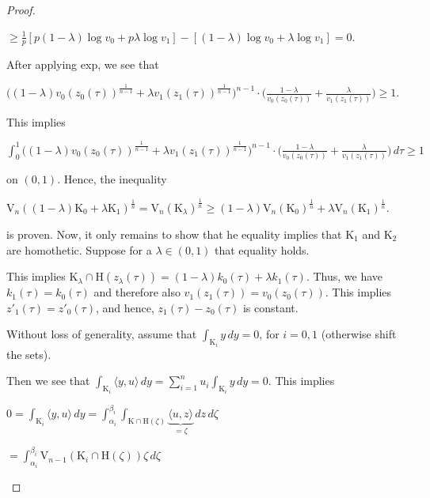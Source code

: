 \documentclass[a4paper]{book}
\numberwithin{theorem}{section}%
\begin{document}
\begin{proof}
\begin{center}
        $\geq\frac{1}{\mathit{p}}[\mathit{p}(1-\lambda)\log{v_{0}}+\mathit{p}\lambda\log{v_{1}}]-[(1-\lambda)\log{v_{0}}+\lambda\log{v_{1}}]=0$.
    \end{center}
    After applying exp, we see that
    \begin{center}
        $\displaystyle \Big((1-\lambda)v_{0}(z_{0}(\tau))^{\frac{1}{n-1}}+\lambda v_{1}(z_{1}(\tau))^{\frac{1}{n-1}}\Big)^{n-1}\cdot\Big(\frac{1-\lambda}{v_{0}(z_{0}(\tau))}+\frac{\lambda}{v_{1}(z_{1}(\tau))}\Big)\geq1$.
    \end{center}
    This implies
    \begin{center}
        $\displaystyle \int_{0}^{1}\Big((1-\lambda)v_{0}(z_{0}(\tau))^{\frac{1}{n-1}}+\lambda v_{1}(z_{1}(\tau))^{\frac{1}{n-1}}\Big)^{n-1}\cdot\Big(\frac{1-\lambda}{v_{0}(z_{0}(\tau))}+\frac{\lambda}{v_{1}(z_{1}(\tau))}\Big)\,d\tau\geq1$
    \end{center}
    on $(0,1)$. Hence, the inequality
    \begin{center}
        $\displaystyle \mathrm{V}_{n}((1-\lambda)\mathrm{K}_{0}+\lambda\mathrm{K}_{1})^{\frac{1}{n}}=\mathrm{V}_{n}(\mathrm{K}_{\lambda})^{\frac{1}{n}}\geq(1-\lambda)\mathrm{V}_{n}(\mathrm{K}_{0})^{\frac{1}{n}}+\lambda\mathrm{V}_{n}(\mathrm{K}_{1})^{\frac{1}{n}}$.
    \end{center}
    is proven. Now, it only remains to show that he equality implies that $\mathrm{K}_{1}$ and $\mathrm{K}_{2}$ are homothetic. Suppose for a $\lambda\in(0,1)$ that equality holds.

    This implies $\mathrm{K}_{\lambda}\cap\mathrm{H}(z_{\lambda}(\tau))=(1-\lambda)k_{0}(\tau)+\lambda k_{1}(\tau)$. Thus, we have $k_{1}(\tau)=k_{0}(\tau)$ and therefore also $v_{1}(z_{1}(\tau))=v_{0}(z_{0}(\tau))$. This implies $z'_{1}(\tau)=z'_{0}(\tau)$, and hence, $z_{1}(\tau)-z_{0}(\tau)$ is constant.

    Without loss of generality, assume that $\int_{\mathrm{K}_i}y\,dy=0$, for $i=0,1$ (otherwise shift the sets).

    Then we see that $\int_{\mathrm{K}_i}\langle y,u\rangle\,dy=\sum_{i=1}^{n}u_{i}\int_{\mathrm{K}_i}y\,dy=0$. This implies
    \begin{center}
        $\displaystyle 0=\int_{\mathrm{K}_i}\langle y,u\rangle\,dy=\int_{\alpha_{i}}^{\beta_{i}}\int_{\mathrm{K}\cap\mathrm{H}(\zeta)}\underbrace{\langle u,z\rangle}_{=\zeta}\,dz\,d\zeta$

        $\displaystyle =\int_{\alpha_{i}}^{\beta_{i}}\mathrm{V}_{n-1}(\mathrm{K}_{i}\cap\mathrm{H}(\zeta))\zeta\,d\zeta$


\end{center}
\end{proof}
\end{document}

